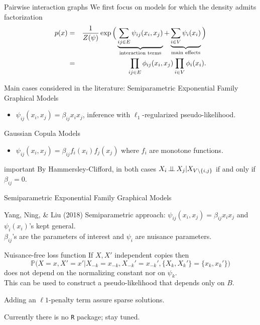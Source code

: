 \documentclass[dvipsnames,aspectratio=169]{beamer} %
\renewcommand{\P}{\mathbb{P}}
\newcommand{\indep}{\mbox{\,$\perp\!\!\!\perp$\,}}
\begin{document}
\begin{frame}{Pairwise interaction graphs}
	We first focus on models for which the density admits factorization
\begin{eqnarray*}
		p(x)&=&\frac{1}{Z(\psi)}\exp\Big(\underbrace{\sum_{ij\in E}\psi_{ij}(x_i,x_j)}_{\mbox{{\scriptsize interaction terms}}}+\underbrace{\sum_{i\in V}\psi_i(x_i)}_{\mbox{{\scriptsize main effects}}}\Big)\\
		&=&\prod_{ij\in E}\phi_{ij}(x_i,x_j)\prod_{i\in V}\phi_i(x_i).
\end{eqnarray*}
\begin{alertblock}{Main cases considered in the literature:}
	Semiparametric Exponential Family Graphical Models
\begin{itemize}
	\item $\psi_{ij}(x_i,x_j)=\beta_{ij}x_i x_j$, inference with $\ell_1$-regularized pseudo-likelihood.\end{itemize}
Gaussian Copula Models
\begin{itemize}
	\item $\psi_{ij}(x_i,x_j)=\beta_{ij}f_i(x_i) f_j(x_j)$ where $f_i$ are monotone functions.
\end{itemize}
\end{alertblock}\begin{beamercolorbox}[wd=\paperwidth,sep=5pt]{important}
	By Hammersley-Clifford, in both cases $X_i\indep X_j|X_{V\setminus \{i,j\}}$ if and only if $\beta_{ij}=0$.
\end{beamercolorbox}
\end{frame}

\begin{frame}{Semiparametric Exponential Family Graphical Models}
\begin{alertblock}{Yang, Ning, \& Liu (2018)}
	Semiparametric approach: $\psi_{ij}(x_i,x_j)=\beta_{ij}x_i x_j$ and $\psi_i(x_i)$'s kept general.\\[.3cm]
	$\beta_{ij}$'s are the parameters of interest and $\psi_i$ are \alert{nuisance} parameters. 
	\begin{alertblock}{Nuisance-free loss function}
	If $X,X'$ independent copies then
	$$
	\P\big(X=x,X'=x'|X_{-k}=x_{-k},X_{-k}'=x_{-k}',\{X_k,X_k'\}=\{x_k,x_k'\}\big)
	$$
does not depend on the normalizing constant nor on $\psi_k$.	\\[.2cm]	
This can be used to construct a pseudo-likelihood that depends only on $B$.		\end{alertblock}
Adding an $\ell1$-penalty term assure sparse solutions.
\end{alertblock}
\medskip 

Currently there is no \texttt{R} package; stay tuned. 
\end{frame}
\end{document}
